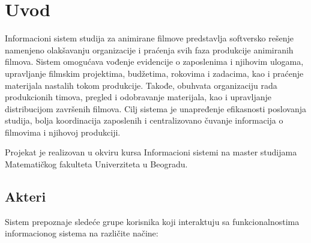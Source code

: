 \section{Uvod}

Informacioni sistem studija za animirane filmove predstavlja softversko rešenje namenjeno olakšavanju organizacije i praćenja svih faza produkcije animiranih filmova. Sistem omogućava vođenje evidencije o zaposlenima i njihovim ulogama, upravljanje filmskim projektima, budžetima, rokovima i zadacima, kao i praćenje materijala nastalih tokom produkcije. Takođe, obuhvata organizaciju rada produkcionih timova, pregled i odobravanje materijala, kao i upravljanje distribucijom završenih filmova. Cilj sistema je unapređenje efikasnosti poslovanja studija, bolja koordinacija zaposlenih i centralizovano čuvanje informacija o filmovima i njihovoj produkciji.

Projekat je realizovan u okviru kursa Informacioni sistemi na master studijama Matematičkog fakulteta Univerziteta u Beogradu.


\subsection{Akteri}
Sistem prepoznaje sledeće grupe korisnika koji interaktuju sa funkcionalnostima informacionog sistema na različite načine:


